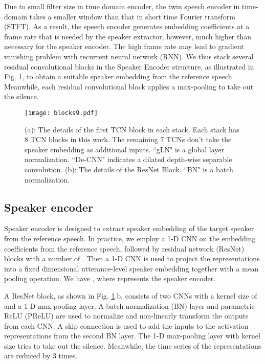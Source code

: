 \documentclass[a4paper]{article}
\begin{document}
Due to small filter size in time domain encoder, the twin speech encoder in time-domain takes a smaller window  than that in short time Fourier transform (STFT). As a result, the speech encoder generates embedding coefficients at a frame rate that is needed by the speaker extractor, however, much higher than necessary for the speaker encoder. The high frame rate may lead to gradient vanishing problem with recurrent neural network (RNN). We thus stack several residual convolutional blocks in the Speaker Encoder structure, as illustrated in Fig. 1, to obtain a suitable speaker embedding from the reference speech. Meanwhile, each residual convolutional block applies a max-pooling to take out the silence.

\begin{figure}[t]
	\centering
	\texttt{[image: blocks9.pdf]}
	\caption{(a): The details of the first TCN block in each stack. Each stack has 8 TCN blocks in this work. The remaining 7 TCNs don't take the speaker embedding as additional inputs. ``gLN" is a global layer normalization. ``De-CNN" indicates a dilated depth-wise separable convolution. (b): The details of the ResNet Block. ``BN" is a batch normalization.}
	\label{fig:blocks}
\end{figure}

\subsection{Speaker encoder}

Speaker encoder is designed to extract speaker embedding of the target speaker from the reference speech. In practice, we employ a 1-D CNN on the embedding coefficients  from the reference speech, followed by residual network (ResNet) blocks with a number of . Then a 1-D CNN is used to project the representations into a fixed dimensional utterance-level speaker embedding  together with a mean pooling operation. We have , where  represents the speaker encoder. 

A ResNet block, as shown in Fig. \ref{fig:blocks}.b, consists of two CNNs with a kernel size of  and a 1-D max-pooling layer. A batch normalization (BN) layer and parametric ReLU (PReLU) are used to normalize and non-linearly transform the outputs from each  CNN. A skip connection is used to add the inputs to the activation representations from the second BN layer. The 1-D max-pooling layer with kernel size  tries to take out the silence. Meanwhile, the time series of the representations are reduced by 3 times.
\end{document}
